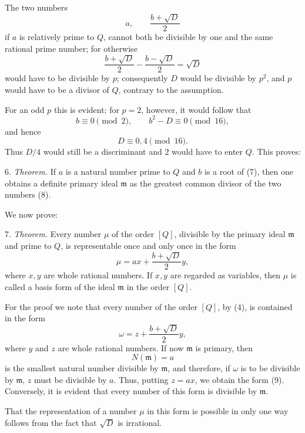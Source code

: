 \documentclass[11pt]{article}
\begin{document}
The two numbers
\begin{equation}
 a,\qquad \frac{b+\sqrt D}{2}
\tag{8}
\end{equation}
if $a$ is relatively prime to $Q$, cannot both be divisible by one and the same rational prime number; for otherwise
\[
 \frac{b+\sqrt D}{2}-\frac{b-\sqrt D}{2}=\sqrt D
\]
would have to be divisible by $p$; consequently $D$ would be divisible by $p^2$, and $p$ would have to be a divisor of $Q$, contrary to the assumption.

For an odd $p$ this is evident; for $p=2$, however, it would follow that
\[
 b\equiv0\pmod2,
 \qquad b^2-D\equiv0\pmod{16},
\]
and hence
\[
 D\equiv0,4\pmod{16}.
\]
Thus $D/4$ would still be a discriminant and $2$ would have to enter $Q$. This proves:

6. \emph{Theorem.} If $a$ is a natural number prime to $Q$ and $b$ is a root of (7), then one obtains a definite primary ideal $\mathfrak m$ as the greatest common divisor of the two numbers (8).

We now prove:

7. \emph{Theorem.} Every number $\mu$ of the order $[Q]$, divisible by the primary ideal $\mathfrak m$ and prime to $Q$, is representable once and only once in the form
\begin{equation}
 \mu=ax+\frac{b+\sqrt D}{2}y,
\tag{9}
\end{equation}
where $x,y$ are whole rational numbers. If $x,y$ are regarded as variables, then $\mu$ is called a basis form of the ideal $\mathfrak m$ in the order $[Q]$.

For the proof we note that every number of the order $[Q]$, by (4), is contained in the form
\begin{equation}
 \omega=z+\frac{b+\sqrt D}{2}y,
\tag{10}
\end{equation}
where $y$ and $z$ are whole rational numbers. If now $\mathfrak m$ is primary, then
\begin{equation}
 N(\mathfrak m)=a
\tag{11}
\end{equation}
is the smallest natural number divisible by $\mathfrak m$, and therefore, if $\omega$ is to be divisible by $\mathfrak m$, $z$ must be divisible by $a$. Thus, putting $z=ax$, we obtain the form (9). Conversely, it is evident that every number of this form is divisible by $\mathfrak m$.

That the representation of a number $\mu$ in this form is possible in only one way follows from the fact that $\sqrt D$ is irrational.
\end{document}
